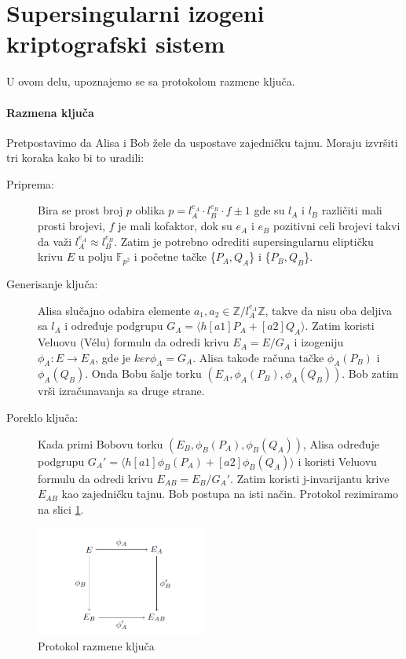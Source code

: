 \documentclass[a4paper]{article}
\begin{document}
\section{Supersingularni izogeni kriptografski sistem}
\label{sec: razmena kljuca}

U ovom delu, upoznajemo se sa protokolom razmene ključa.

\paragraph{Razmena ključa} Pretpostavimo da Alisa i Bob žele da uspostave zajedničku tajnu. Moraju izvršiti tri koraka kako bi to uradili:

\begin{description}
	\item[Priprema:] Bira se prost broj $p$ oblika $p = l^{e_A}_{A} \cdot l^{e_B}_{B} \cdot f \pm 1$ gde su $l_{A}$ i  $l_{B}$ različiti mali prosti brojevi, $f$ je mali kofaktor, dok su $e_A$ i $e_B$ pozitivni celi brojevi takvi da važi $l^{e_A}_{A} \approx l^{e_B}_{B}$. Zatim je potrebno odrediti supersingularnu eliptičku krivu $E$ u polju $\mathbb{F}_{p^2}$ i početne tačke \{$P_A, Q_A$\} i \{$P_B, Q_B$\}. 
	
	
	\item[Generisanje ključa:] Alisa slučajno odabira elemente $a_1, a_2 \in \mathbb{Z}/l^{e_A}_{A}\mathbb{Z}$, takve da nisu oba deljiva sa $l_A$ i određuje podgrupu $G_A = \langle h[a1]P_A + [a2]Q_A \rangle $. Zatim koristi Veluovu (V\' elu) formulu da odredi krivu $E_A = E/G_A$ i izogeniju $\phi_A: E \longrightarrow E_A$, gde je $ker \phi_A = G_A$. Alisa takođe računa tačke $\phi_A(P_B)$ i $\phi_A(Q_B)$. Onda Bobu šalje torku $(E_A, \phi_A(P_B), \phi_A(Q_B))$. Bob  zatim vrši izračunavanja sa druge strane.
	
	\item[Poreklo ključa:] Kada primi Bobovu torku $(E_B, \phi_B(P_A), \phi_B(Q_A))$, Alisa određuje podgrupu $G_A' = \langle h[a1]\phi_B(P_A) + [a2]\phi_B(Q_A) \rangle$ i koristi Veluovu formulu da odredi krivu $E_{AB} = E_B / G_A'$. Zatim koristi j-invarijantu krive $E_{AB}$ kao zajedničku tajnu. Bob postupa na isti način. Protokol rezimiramo na slici \ref{fig: razmena kljuca}.
	
\end{description}


\begin{figure}[h]
	\centering
	\includegraphics[width=0.5\textwidth]{razmena_kljuca.png}
	\caption{Protokol razmene ključa}
	\label{fig: razmena kljuca}
\end{figure}
\end{document}
